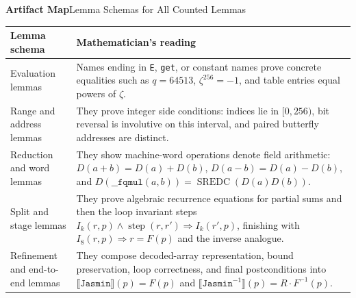 \documentclass[10pt,aspectratio=1610,compress,dvipsnames]{beamer}
\newcommand{\ec}[1]{\texttt{#1}}
\begin{document}
\begin{frame}{\bfseries Artifact Map}{Lemma Schemas for All Counted Lemmas}
\begin{center}
\tiny\renewcommand{\arraystretch}{1.13}
\setlength{\tabcolsep}{3pt}
\begin{tabular}{p{2.8cm}p{8.2cm}}
\toprule[1.2pt]
\textbf{Lemma schema} & \textbf{Mathematician's reading} \\
\midrule
Evaluation lemmas &
Names ending in \ec{E}, \ec{get}, or constant names prove concrete equalities
such as $q=64513$, $\zeta^{256}=-1$, and table entries equal powers of
$\zeta$. \\
Range and address lemmas &
They prove integer side conditions: indices lie in $[0,256)$, bit reversal is
involutive on this interval, and paired butterfly addresses are distinct. \\
Reduction and word lemmas &
They show machine-word operations denote field arithmetic:
$D(a+b)=D(a)+D(b)$, $D(a-b)=D(a)-D(b)$, and
$D(\ec{\_\_fqmul}(a,b))=\operatorname{SREDC}(D(a)D(b))$. \\
Split and stage lemmas &
They prove algebraic recurrence equations for partial sums and then the loop
invariant steps
$I_k(r,p)\land\operatorname{step}(r,r')\Rightarrow I_k(r',p)$, finishing with
$I_8(r,p)\Rightarrow r=F(p)$ and the inverse analogue. \\
Refinement and end-to-end lemmas &
They compose decoded-array representation, bound preservation, loop
correctness, and final postconditions into
$\llbracket\mathtt{Jasmin}\rrbracket(p)=F(p)$ and
$\llbracket\mathtt{Jasmin}^{-1}\rrbracket(p)=R\cdot F^{-1}(p)$. \\
\bottomrule[1.2pt]
\end{tabular}
\end{center}
\end{frame}
\end{document}
